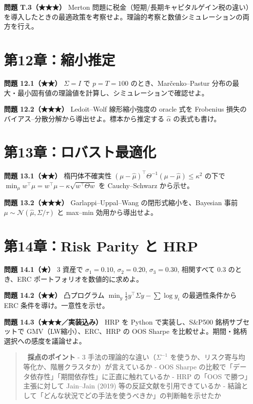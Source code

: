 \documentclass[11pt,a4paper]{report}
\begin{document}
\textbf{問題 T.3（★★★）} Merton 問題に税金（短期/長期キャピタルゲイン税の違い）を導入したときの最適政策を考察せよ。理論的考察と数値シミュレーションの両方を行え。

\section{第12章：縮小推定}

\textbf{問題 12.1（★★）} $\Sigma = I$ で $p = T = 100$ のとき、Marčenko–Pastur 分布の最大・最小固有値の理論値を計算し、シミュレーションで確認せよ。

\textbf{問題 12.2（★★★）} Ledoit–Wolf 線形縮小強度の oracle 式を Frobenius 損失のバイアス–分散分解から導出せよ。標本から推定する $\hat\alpha$ の表式も書け。

\section{第13章：ロバスト最適化}

\textbf{問題 13.1（★★）} 楕円体不確実性 $(\mu - \hat\mu)^\top \Theta^{-1} (\mu - \hat\mu) \le \kappa^2$ の下で $\min_\mu w^\top \mu = w^\top \hat\mu - \kappa \sqrt{w^\top \Theta w}$ を Cauchy–Schwarz から示せ。

\textbf{問題 13.2（★★★）} Garlappi–Uppal–Wang の閉形式縮小を、Bayesian 事前 $\mu \sim \mathcal{N}(\hat\mu, \Sigma/\tau)$ と max–min 効用から導出せよ。

\section{第14章：Risk Parity と HRP}

\textbf{問題 14.1（★）} 3 資産で $\sigma_1 = 0.10$, $\sigma_2 = 0.20$, $\sigma_3 = 0.30$, 相関すべて $0.3$ のとき、ERC ポートフォリオを数値的に求めよ。

\textbf{問題 14.2（★★）} 凸プログラム $\min_y \tfrac{1}{2} y^\top \Sigma y - \sum \log y_i$ の最適性条件から ERC 条件を導け。一意性を示せ。

\textbf{問題 14.3（★★★／実装込み）} HRP を Python で実装し、S\&P500 銘柄サブセットで GMV（LW縮小）、ERC、HRP の OOS Sharpe を比較せよ。期間・銘柄選択への感度を議論せよ。

\begin{quote}
📝 \textbf{採点のポイント}
- 3 手法の理論的な違い（$\Sigma^{-1}$ を使うか、リスク寄与均等化か、階層クラスタか）が言えているか
- OOS Sharpe の比較で「データ依存性」「期間依存性」に正直に触れているか
- HRP の「OOS で勝つ」主張に対して Jain–Jain (2019) 等の反証文献を引用できているか
- 結論として「どんな状況でどの手法を使うべきか」の判断軸を示せたか
\end{quote}
\end{document}
